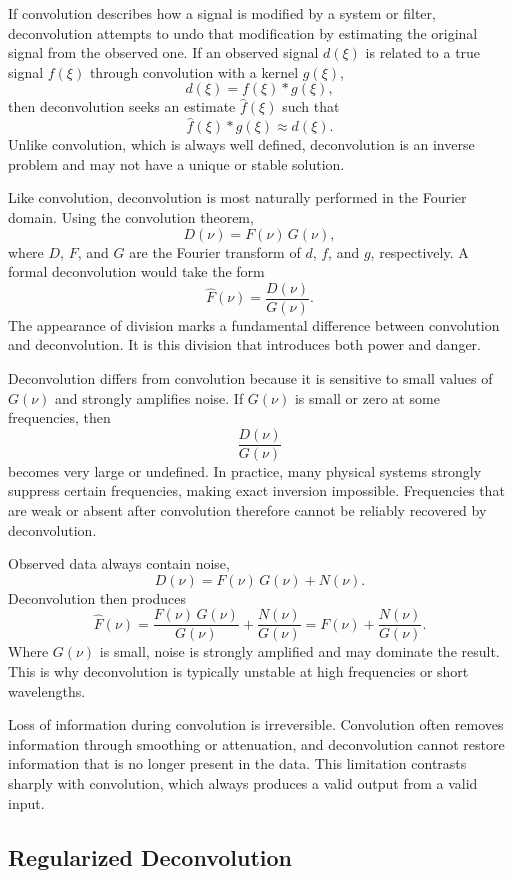 If convolution describes how a signal is modified by a system or filter, deconvolution attempts to undo that modification by estimating the original signal from the observed one. If an observed signal $d(\xi)$ is related to a true signal $f(\xi)$ through convolution with a kernel $g(\xi)$,
\[
    d(\xi) = f(\xi) * g(\xi),
\]
then deconvolution seeks an estimate $\hat{f}(\xi)$ such that
\[
    \hat{f}(\xi) * g(\xi) \approx d(\xi).
\]
Unlike convolution, which is always well defined, deconvolution is an inverse problem and may not have a unique or stable solution.

Like convolution, deconvolution is most naturally performed in the Fourier domain. Using the convolution theorem,
\[
    D(\nu) = F(\nu)\,G(\nu),
\]
where $D$, $F$, and $G$ are the Fourier transform of $d$, $f$, and $g$, respectively. A formal deconvolution would take the form
\[
    \hat{F}(\nu) = \frac{D(\nu)}{G(\nu)}.
\]
The appearance of division marks a fundamental difference between convolution and deconvolution. It is this division that introduces both power and danger.

Deconvolution differs from convolution because it is sensitive to small values of $G(\nu)$ and strongly amplifies noise. If $G(\nu)$ is small or zero at some frequencies, then
\[
    \frac{D(\nu)}{G(\nu)}
\]
becomes very large or undefined. In practice, many physical systems strongly suppress certain frequencies, making exact inversion impossible. Frequencies that are weak or absent after convolution therefore cannot be reliably recovered by deconvolution.

Observed data always contain noise,
\[
    D(\nu) = F(\nu)\,G(\nu) + N(\nu).
\]
Deconvolution then produces
\[
    \hat{F}(\nu) = \frac{F(\nu)\,G(\nu)}{G(\nu)} + \frac{N(\nu)}{G(\nu)}
                = F(\nu) + \frac{N(\nu)}{G(\nu)}.
\]
Where $G(\nu)$ is small, noise is strongly amplified and may dominate the result. This is why deconvolution is typically unstable at high frequencies or short wavelengths.

Loss of information during convolution is irreversible. Convolution often removes information through smoothing or attenuation, and deconvolution cannot restore information that is no longer present in the data. This limitation contrasts sharply with convolution, which always produces a valid output from a valid input.

\subsection{Regularized Deconvolution}

